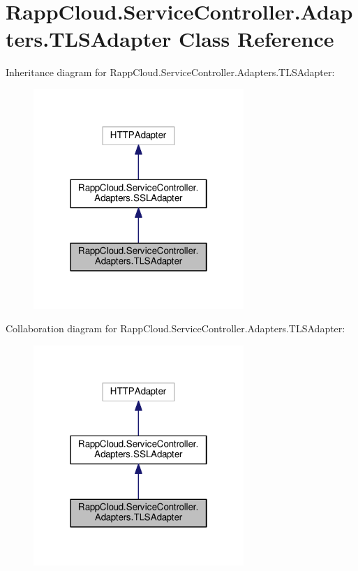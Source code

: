 \hypertarget{classRappCloud_1_1ServiceController_1_1Adapters_1_1TLSAdapter}{\section{Rapp\-Cloud.\-Service\-Controller.\-Adapters.\-T\-L\-S\-Adapter Class Reference}
\label{classRappCloud_1_1ServiceController_1_1Adapters_1_1TLSAdapter}
}


Inheritance diagram for Rapp\-Cloud.\-Service\-Controller.\-Adapters.\-T\-L\-S\-Adapter\-:
\nopagebreak
\begin{figure}[H]
\begin{center}
\leavevmode
\includegraphics[width=226pt]{classRappCloud_1_1ServiceController_1_1Adapters_1_1TLSAdapter__inherit__graph}
\end{center}
\end{figure}


Collaboration diagram for Rapp\-Cloud.\-Service\-Controller.\-Adapters.\-T\-L\-S\-Adapter\-:
\nopagebreak
\begin{figure}[H]
\begin{center}
\leavevmode
\includegraphics[width=226pt]{classRappCloud_1_1ServiceController_1_1Adapters_1_1TLSAdapter__coll__graph}
\end{center}
\end{figure}
